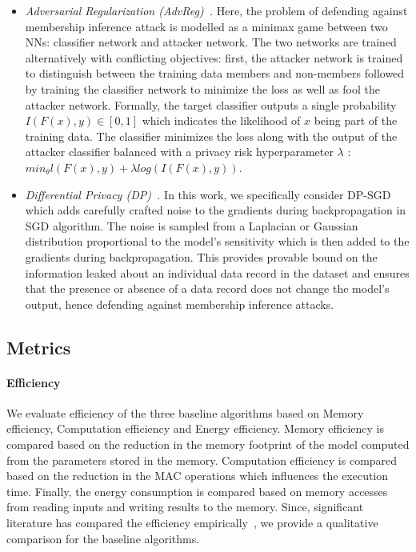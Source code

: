 \begin{itemize}[leftmargin=*]
\item {\em Adversarial Regularization (AdvReg)~\cite{DBLP:conf/ccs/NasrSH18}.} Here, the problem of defending against membership inference attack is modelled as a minimax game between two NNs: classifier network and attacker network.
The two networks are trained alternatively with conflicting objectives: first, the attacker network is trained to distinguish between the training data members and non-members followed by training the classifier network to minimize the loss as well as fool the attacker network.
Formally, the target classifier outputs a single probability $I(F(x),y) \in [0,1]$ which indicates the likelihood of $x$ being part of the training data.
The classifier minimizes the loss along with the output of the attacker classifier balanced with a privacy risk hyperparameter $\lambda$ : $min_{\theta} l(F(x),y) + \lambda log(I(F(x),y))$.

\item {\em Differential Privacy (DP)~\cite{Abadi:2016:DLD:2976749.2978318}.} In this work, we specifically consider DP-SGD which adds carefully crafted noise to the gradients during backpropagation in SGD algorithm.
The noise is sampled from a Laplacian or Gaussian distribution proportional to the model's sensitivity which is then added to the gradients during backpropagation.
This provides provable bound on the information leaked about an individual data record in the dataset and ensures that the presence or absence of a data record does not change the model's output, hence defending against membership inference attacks.
\end{itemize}

\subsection{Metrics}
\label{metrics}

\paragraph{Efficiency} We evaluate efficiency of the three baseline algorithms based on Memory efficiency, Computation efficiency and Energy efficiency. Memory efficiency is compared based on the reduction in the memory footprint of the model computed from the parameters stored in the memory. Computation efficiency is compared based on the reduction in the MAC operations which influences the execution time. Finally, the energy consumption is compared based on memory accesses from reading inputs and writing results to the memory. Since, significant literature has compared the efficiency empirically~\cite{8114708}, we provide a qualitative comparison for the baseline algorithms.

